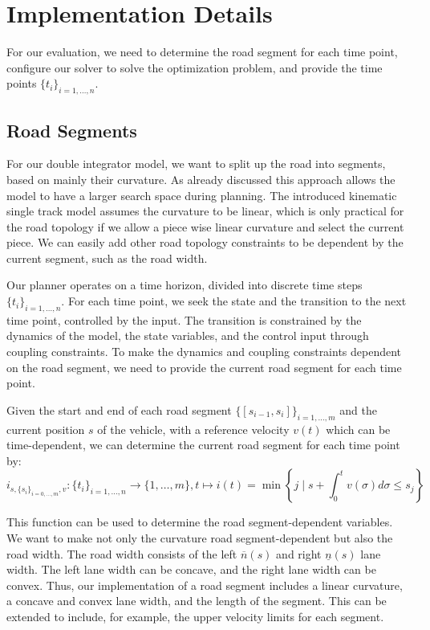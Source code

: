 \section{Implementation Details} \label{sec:implementation_details}

For our evaluation, we need to determine the road segment for each time point, configure our solver to solve the optimization problem, and provide
the time points $\{t_i\}_{i=1,\dots,n}$.

\subsection{Road Segments}

For our double integrator model, we want to split up the road into segments, based on mainly their curvature.
As already discussed this approach allows the model to have a larger search space during planning.
The introduced kinematic single track model assumes the curvature to be linear, which is only practical for the road topology if we allow a piece
wise linear curvature and select the current piece.
We can easily add other road topology constraints to be dependent by the current segment, such as the road width.

Our planner operates on a time horizon, divided into discrete time steps $\{t_i\}_{i=1,\dots,n}$.
For each time point, we seek the state and the transition to the next time point, controlled by the input.
The transition is constrained by the dynamics of the model, the state variables, and the control input through coupling constraints.
To make the dynamics and coupling constraints dependent on the road segment, we need to provide the current road segment for each time point.

Given the start and end of each road segment $\{[s_{i-1}, s_{i}]\}_{i=1,\dots,m}$ and the current position $s$ of the vehicle, with a reference velocity
$v(t)$ which can be time-dependent, we can determine the current road segment for each time point by:
\begin{equation}
	i_{s, \{s_{i}\}_{i=0,\dots,m}, v}: \{t_i\}_{i=1,\dots,n} \to \{1,\dots,m\}, t \mapsto i(t) = \min \left\{ j \mid s + \int_{0}^{t} v(\sigma) d\sigma \leq s_j \right\}
\end{equation}

This function can be used to determine the road segment-dependent variables.
We want to make not only the curvature road segment-dependent but also the road width.
The road width consists of the left $\overline{n}(s)$ and right $\underline{n}(s)$ lane width.
The left lane width can be concave, and the right lane width can be convex.
Thus, our implementation of a road segment includes a linear curvature, a concave and convex lane width, and the length of the segment.
This can be extended to include, for example, the upper velocity limits for each segment.

